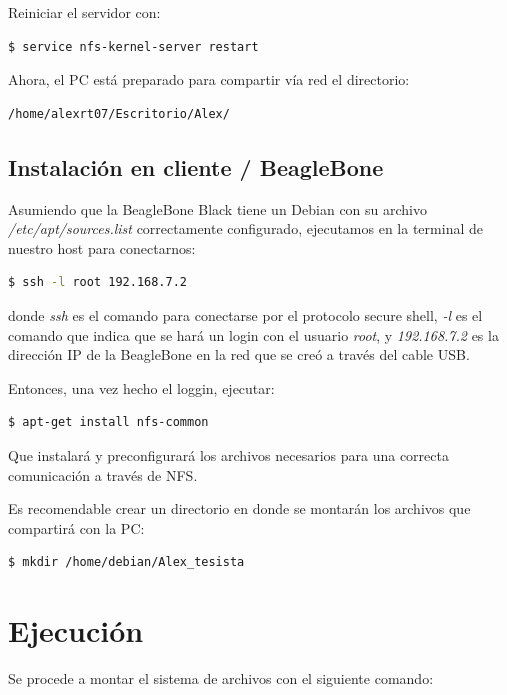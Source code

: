 Reiniciar el servidor con: 

\begin{lstlisting}[language=bash]
$ service nfs-kernel-server restart
\end{lstlisting}

Ahora, el PC está preparado para compartir vía red el directorio:

\begin{lstlisting}[language=bash]
/home/alexrt07/Escritorio/Alex/
\end{lstlisting}

\subsection{Instalación en cliente / BeagleBone}

Asumiendo que la BeagleBone Black tiene un Debian con su archivo \textit{/etc/apt/sources.list} correctamente configurado, ejecutamos en la terminal de nuestro host para conectarnos:

\begin{lstlisting}[language=bash]
$ ssh -l root 192.168.7.2
\end{lstlisting}

donde \textit{ssh} es el comando para conectarse por el protocolo secure shell, \textit{-l} es el comando que indica que se hará un login con el usuario \textit{root}, y \textit{192.168.7.2} es la dirección IP de la BeagleBone en la red que se creó a través del cable USB.

Entonces, una vez hecho el loggin, ejecutar:

\begin{lstlisting}[language=bash]
$ apt-get install nfs-common
\end{lstlisting}

Que instalará y preconfigurará los archivos necesarios para una correcta comunicación a través de NFS.

Es recomendable crear un directorio en donde se montarán los archivos que compartirá con la PC:

\begin{lstlisting}[language=bash]
$ mkdir /home/debian/Alex_tesista
\end{lstlisting}

\section{Ejecución}

Se procede a montar el sistema de archivos con el siguiente comando:

